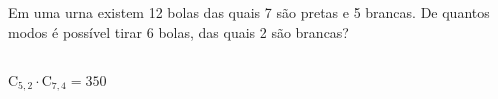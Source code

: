 \begin{ex}
 Em uma urna existem 12 bolas das quais 7 são pretas e 5 brancas. De quantos modos é possível tirar 6 bolas, das quais 2 são brancas?
   \begin{sol}
       \phantom{A} \\
   $\mathrm{C}_{5,2}\cdot \mathrm{C}_{7,4}=350$
   \end{sol}
\end{ex}